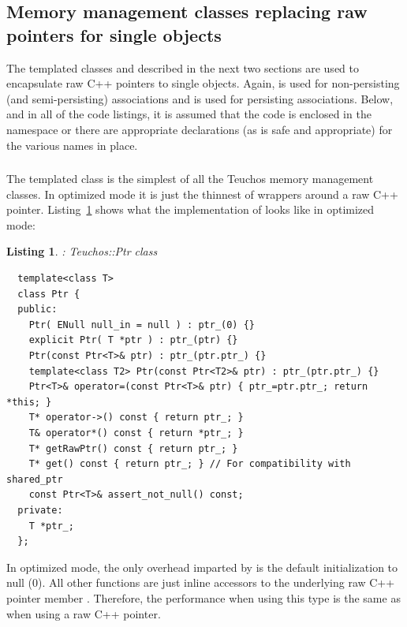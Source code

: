 \documentclass[pdf,ps2pdf,11pt]{SANDreport}
\newtheorem{listing}{Listing}
\begin{document}


%
{}\subsection{Memory management classes replacing raw pointers for
single objects}
\label{sec:mem-mng-classes-single-objs}
%

The templated classes {} and {} described in the
next two sections are used to encapsulate raw C++ pointers to single
objects.  Again, {} is used for non-persisting (and
semi-persisting) associations and {} is used for persisting
associations.  Below, and in all of the code listings, it is assumed
that the code is enclosed in the {} namespace or there
are appropriate {} declarations (as is safe
and appropriate) for the various names in place.

%
{}\subsubsection{}
\label{sec:Ptr}
%

The templated class {} is the simplest of all the Teuchos
memory management classes.  In optimized mode it is just the thinnest
of wrappers around a raw C++ pointer.  Listing~\ref{listing:Ptr}
shows what the implementation of {} looks like in
optimized mode:

\begin{listing}: Teuchos::Ptr class\\
\label{listing:Ptr}
{\small\begin{verbatim}
  template<class T>
  class Ptr {
  public:
    Ptr( ENull null_in = null ) : ptr_(0) {}
    explicit Ptr( T *ptr ) : ptr_(ptr) {}
    Ptr(const Ptr<T>& ptr) : ptr_(ptr.ptr_) {}
    template<class T2> Ptr(const Ptr<T2>& ptr) : ptr_(ptr.ptr_) {}
    Ptr<T>& operator=(const Ptr<T>& ptr) { ptr_=ptr.ptr_; return *this; }
    T* operator->() const { return ptr_; }
    T& operator*() const { return *ptr_; }
    T* getRawPtr() const { return ptr_; }
    T* get() const { return ptr_; } // For compatibility with shared_ptr
    const Ptr<T>& assert_not_null() const;
  private:
    T *ptr_;
  };
\end{verbatim}}
\end{listing}

In optimized mode, the only overhead imparted by {} is the
default initialization to null (0).  All other functions are just
inline accessors to the underlying raw C++ pointer member
{}.  Therefore, the performance when using this type is the
same as when using a raw C++ pointer.
\end{document}
